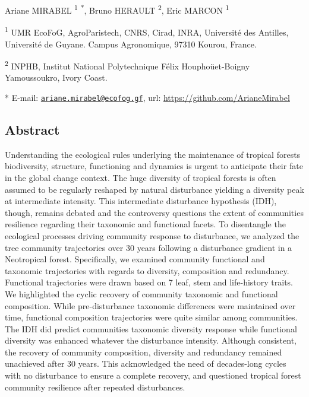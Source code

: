 \documentclass[
  11pt,
  french,
  A4paper,
  extrafontsizes,onecolumn,openright
  ]{memoir}
\begin{document}
Ariane MIRABEL \textsuperscript{1} \textsuperscript{*}, Bruno HERAULT
\textsuperscript{2}, Eric MARCON \textsuperscript{1} \newline

\textsuperscript{1} UMR EcoFoG, AgroParistech, CNRS, Cirad, INRA,
Université des Antilles, Université de Guyane. Campus Agronomique, 97310
Kourou, France.

\textsuperscript{2} INPHB, Institut National Polytechnique Félix
Houphoüet-Boigny Yamoussoukro, Ivory Coast. \newline

* E-mail:
\href{mailto:ariane.mirabel@ecofog.gf}{\nolinkurl{ariane.mirabel@ecofog.gf}},
url: \url{https://github.com/ArianeMirabel}

\subsection{Abstract}\label{abstract-1}

Understanding the ecological rules underlying the maintenance of
tropical forests biodiversity, structure, functioning and dynamics is
urgent to anticipate their fate in the global change context. The huge
diversity of tropical forests is often assumed to be regularly reshaped
by natural disturbance yielding a diversity peak at intermediate
intensity. This intermediate disturbance hypothesis (IDH), though,
remains debated and the controversy questions the extent of communities
resilience regarding their taxonomic and functional facets. To
disentangle the ecological processes driving community response to
disturbance, we analyzed the tree community trajectories over 30 years
following a disturbance gradient in a Neotropical forest. Specifically,
we examined community functional and taxonomic trajectories with regards
to diversity, composition and redundancy. Functional trajectories were
drawn based on 7 leaf, stem and life-history traits. We highlighted the
cyclic recovery of community taxonomic and functional composition. While
pre-disturbance taxonomic differences were maintained over time,
functional composition trajectories were quite similar among
communities. The IDH did predict communities taxonomic diversity
response while functional diversity was enhanced whatever the
disturbance intensity. Although consistent, the recovery of community
composition, diversity and redundancy remained unachieved after 30
years. This acknowledged the need of decades-long cycles with no
disturbance to ensure a complete recovery, and questioned tropical
forest community resilience after repeated disturbances.
\end{document}
